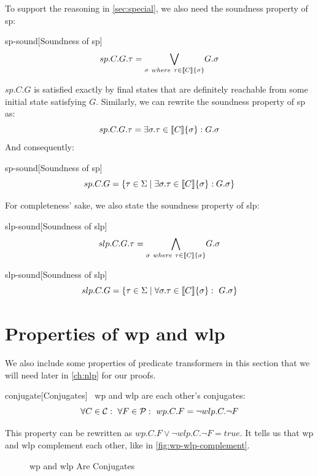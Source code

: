 To support the reasoning in \autoref{sec:special}, we also need the soundness property of sp: 
\begin{theorem}{sp-sound}[Soundness of sp]~{\normalfont\cite{vries11,zhang22}}
\ \vspace{-1.5mm}
\[
sp.C.G.\tau = \underset{\sigma\ where\ \tau\in\llbracket C \rrbracket\{\sigma\}}{\bigvee} G.\sigma
\]
\end{theorem}

$sp.C.G$ is satisfied exactly by final states that are definitely reachable from some initial state satisfying $G$. 
Similarly, we can rewrite the soundness property of sp as: 
\[sp.C.G.\tau = \exists \sigma.\tau\in\llbracket C \rrbracket\{\sigma\}: G.\sigma\]
And consequently: 
\begin{corollary}{sp-sound}[Soundness of sp]
  \[sp.C.G = \{\tau\in{\Sigma}\mid \exists\sigma.\tau\in\llbracket C \rrbracket\{\sigma\}: G.\sigma\}\]
\end{corollary}

For completeness' sake, we also state the soundness property of slp: 
\begin{theorem}{slp-sound}[Soundness of slp]~{\normalfont\cite{zhang22}}
  \ \vspace{-1.5mm}
  \[
  slp.C.G.\tau = \underset{\sigma\ where\ \tau\in\llbracket C \rrbracket\{\sigma\}}{\bigwedge} G.\sigma
  \]
\end{theorem}
\begin{corollary}{slp-sound}[Soundness of slp]
  \[slp.C.G = \{\tau\in{\Sigma}\mid \forall\sigma.\tau\in\llbracket C \rrbracket\{\sigma\}:\ G.\sigma\}\]
\end{corollary}

\section{Properties of wp and wlp}\label{sec:prop}
We also include some properties of predicate transformers in this section that we will need later in \autoref{ch:nlp} for our proofs. 
\begin{theorem}{conjugate}[Conjugates]~{\normalfont\cite{zhang22}}
  wp and wlp are each other's conjugates:
  \[\forall C\in\mathcal{C}:\ \forall F\in\mathcal{P}:\ wp.C.F = \neg wlp.C.\neg F\]
\end{theorem}
This property can be rewritten as $wp.C.F\vee \neg wlp.C.\neg F = true$.
It tells us that wp and wlp complement each other, like in \autoref{fig:wp-wlp-complement}. 

\begin{figure}[ht!]\centering
  
  \caption{wp and wlp Are Conjugates}
  \label{fig:wp-wlp-complement}
\end{figure}



